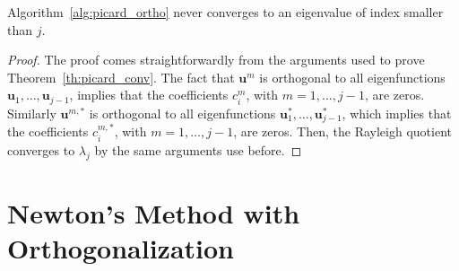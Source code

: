 \documentclass[smallextended]{svjour3}
\begin{document}
\begin{theorem}
Algorithm~\ref{alg:picard_ortho} never converges to an eigenvalue of index smaller than $j$.
\end{theorem}

\begin{proof}
The proof comes straightforwardly from the arguments used to prove Theorem~\ref{th:picard_conv}.
The fact that $\mathbf{u}^m$ is orthogonal to all eigenfunctions $\mathbf{u}_1,\dots,\mathbf{u}_{j-1}$, implies that the coefficients $c_i^m$, with $m=1,\dots,j-1$, are zeros. Similarly $\mathbf{u}^{m,*}$ is orthogonal to all eigenfunctions $\mathbf{u}_1^*,\dots,\mathbf{u}_{j-1}^*$, which implies that the coefficients $c_i^{m,*}$, with $m=1,\dots,j-1$, are zeros.
Then, the Rayleigh quotient converges to $\lambda_j$ by the same arguments use before.
\end{proof}




\section{Newton's Method with Orthogonalization}\label{sec:newton}
\end{document}
